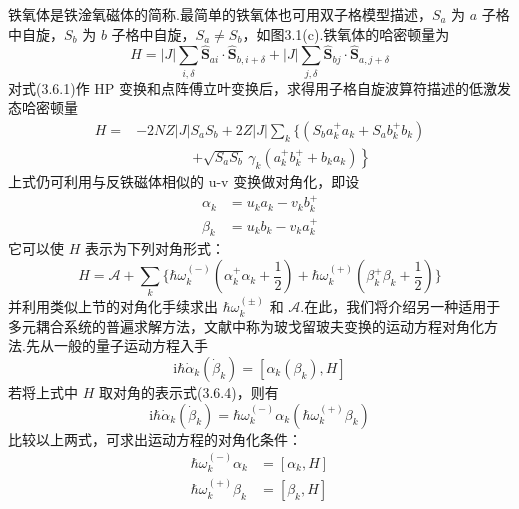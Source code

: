 铁氧体是铁淦氧磁体的简称.最简单的铁氧体也可用双子格模型描述，$S_a$ 为 $a$
子格中自旋，$S_b$ 为 $b$ 子格中自旋，$S_a\neq S_b$，如图3.1(c).铁氧体的哈密顿量为
\begin{equation}
  H=\left|J\right|\sum_{i,\delta}\hat{\boldsymbol{S}}_{ai}\cdot\hat{\boldsymbol{S}}_{b,i+\delta}
  +\left|J\right|\sum_{j,\delta}\hat{\boldsymbol{S}}_{bj}\cdot\hat{\boldsymbol{S}}_{a,j+\delta}
\end{equation}
对式(3.6.1)作 HP 变换和点阵傅立叶变换后，求得用子格自旋波算符描述的低激发态哈密顿量
\begin{equation}
\begin{aligned}
  H={}&-2NZ\left|J\right|S_aS_b+2Z\left|J\right|\sum_k\bigl\{\left(S_ba_k^{+}a_k+S_ab_k^{+}b_k\right)\\
  &\qquad\qquad\left.+\sqrt{S_aS_b}\,\gamma_k\left(a_k^{+}b_k^{+}+b_ka_k\right)\right\}
\end{aligned}
\end{equation}
上式仍可利用与反铁磁体相似的 u-v 变换做对角化，即设
\begin{equation}
\begin{aligned}
  \alpha_k&=u_ka_k-v_kb_k^{+}\\
  \beta_k&=u_kb_k-v_ka_k^{+}
\end{aligned}
\end{equation}
它可以使 $H$ 表示为下列对角形式：
\begin{equation}
  H=\mathcal{A}+\sum_k\biggl\{\hbar\omega_k^{(-)}\left(\alpha_k^{+}\alpha_k+\frac{1}{2}\right)
  +\hbar\omega_k^{(+)}\left(\beta_k^{+}\beta_k+\frac{1}{2}\right)\biggr\}
\end{equation}
并利用类似上节的对角化手续求出 $\hbar\omega_k^{(\pm)}$ 和
$\mathcal{A}$.在此，我们将介绍另一种适用于多元耦合系统的普遍求解方法，文献中称为玻戈留玻夫变换的运动方程对角化方法.先从一般的量子运动方程入手
\begin{equation}
  \mathrm{i}\hbar\dot{\alpha}_k\left(\dot{\beta}_k\right)=\left[\alpha_k\left(\beta_k\right),H\right]
\end{equation}
若将上式中 $H$ 取对角的表示式(3.6.4)，则有
\begin{equation}
  \mathrm{i}\hbar\dot{\alpha}_k\left(\dot{\beta}_k\right)
  =\hbar\omega_k^{(-)}\alpha_k\left(\hbar\omega_k^{(+)}\beta_k\right)
\end{equation}
比较以上两式，可求出运动方程的对角化条件：
\begin{equation}
\begin{aligned}
  \hbar\omega_k^{(-)}\alpha_k&=\left[\alpha_k,H\right]\\
  \hbar\omega_k^{(+)}\beta_k&=\left[\beta_k,H\right]
\end{aligned}
\end{equation}
